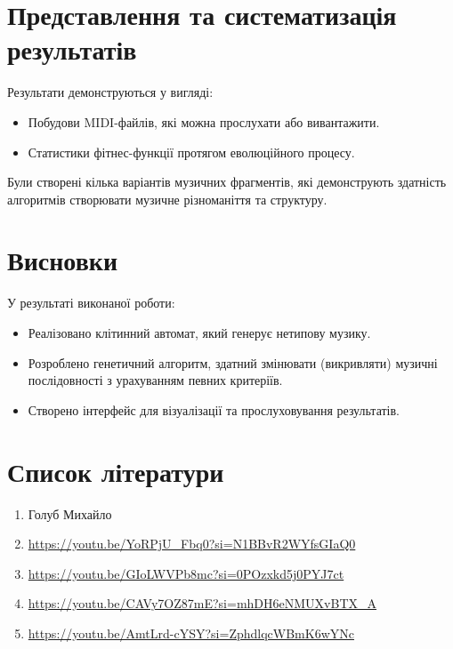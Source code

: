 \documentclass{article}
\begin{document}
    \section{Представлення та систематизація результатів}
        Результати демонструються у вигляді:
        \begin{itemize}
            \item Побудови MIDI-файлів, які можна прослухати або вивантажити.
            \item Статистики фітнес-функції протягом еволюційного процесу.
        \end{itemize}
        Були створені кілька варіантів музичних фрагментів, які демонструють здатність алгоритмів створювати музичне різноманіття та структуру.
    

    \section{Висновки}
        У результаті виконаної роботи:
        \begin{itemize}
            \item Реалізовано клітинний автомат, який генерує нетипову музику.
            \item Розроблено генетичний алгоритм, здатний змінювати (викривляти) музичні послідовності з урахуванням певних критеріїв.
            \item Створено інтерфейс для візуалізації та прослуховування результатів.
        \end{itemize}

    \section{Список літератури}
        \begin{enumerate}
            \item Голуб Михайло
            \item \url{https://youtu.be/YoRPjU_Fbq0?si=N1BBvR2WYfsGIaQ0}
            \item \url{https://youtu.be/GIoLWVPb8mc?si=0POzxkd5j0PYJ7ct}
            \item \url{https://youtu.be/CAVy7OZ87mE?si=mhDH6eNMUXvBTX_A}
            \item \url{https://youtu.be/AmtLrd-cYSY?si=ZphdlqcWBmK6wYNc}
        \end{enumerate}
\end{document}
